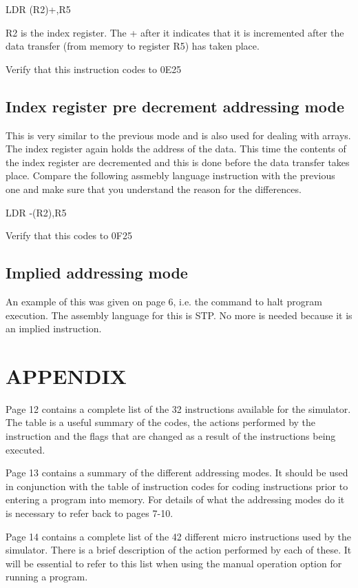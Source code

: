 \documentclass{article}
\begin{document}
\qquad LDR (R2)+,R5

R2 is the index register. The + after it indicates that it is incremented after the data transfer (from memory to register R5) has taken place.

Verify that this instruction codes to 0E25

\subsection{Index register pre decrement addressing mode}

This is very similar to the previous mode and is also used for dealing with arrays. The index register again holds the address of the data. This time the contents of the index register are decremented and this is done before the data transfer takes place. Compare the following assmebly language instruction with the previous one and make sure that you understand the reason for the differences.

\qquad LDR -(R2),R5

Verify that this codes to 0F25

\subsection{Implied addressing mode}

An example of this was given on page 6, i.e. the command to halt program execution. The assembly language for this is STP. No more is needed because it is an implied instruction.

\section{APPENDIX}

Page 12 contains a complete list of the 32 instructions available for the simulator. The table is a useful summary of the codes, the actions performed by the instruction and the flags that are changed as a result of the instructions being executed.

Page 13 contains a summary of the different addressing modes. It should be used in conjunction with the table of instruction codes for coding instructions prior to entering a program into memory. For details of what the addressing modes do it is necessary to refer back to pages 7-10.

Page 14 contains a complete list of the 42 different micro instructions used by the simulator. There is a brief description of the action performed by each of these. It will be essential to refer to this list when using the manual operation option for running a program.
\end{document}
